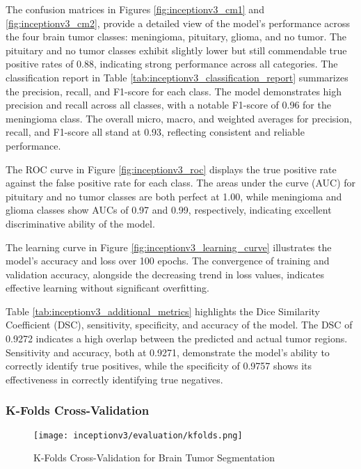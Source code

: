 The confusion matrices in Figures \ref{fig:inceptionv3_cm1} and \ref{fig:inceptionv3_cm2}, provide a detailed view of the model's performance across the four brain tumor classes: meningioma, pituitary, glioma, and no tumor. The pituitary and no tumor classes exhibit slightly lower but still commendable true positive rates of 0.88, indicating strong performance across all categories. The classification report in Table \ref{tab:inceptionv3_classification_report} summarizes the precision, recall, and F1-score for each class. The model demonstrates high precision and recall across all classes, with a notable F1-score of 0.96 for the meningioma class. The overall micro, macro, and weighted averages for precision, recall, and F1-score all stand at 0.93, reflecting consistent and reliable performance.

The ROC curve in Figure \ref{fig:inceptionv3_roc} displays the true positive rate against the false positive rate for each class. The areas under the curve (AUC) for pituitary and no tumor classes are both perfect at 1.00, while meningioma and glioma classes show AUCs of 0.97 and 0.99, respectively, indicating excellent discriminative ability of the model.

The learning curve in Figure \ref{fig:inceptionv3_learning_curve} illustrates the model's accuracy and loss over 100 epochs. The convergence of training and validation accuracy, alongside the decreasing trend in loss values, indicates effective learning without significant overfitting.

Table \ref{tab:inceptionv3_additional_metrics} highlights the Dice Similarity Coefficient (DSC), sensitivity, specificity, and accuracy of the model. The DSC of 0.9272 indicates a high overlap between the predicted and actual tumor regions. Sensitivity and accuracy, both at 0.9271, demonstrate the model's ability to correctly identify true positives, while the specificity of 0.9757 shows its effectiveness in correctly identifying true negatives.

\subsubsection{K-Folds Cross-Validation}

\begin{figure}[H]
  \begin{center}
    \texttt{[image: inceptionv3/evaluation/kfolds.png]}
  \end{center}
  \caption{K-Folds Cross-Validation for Brain Tumor Segmentation}\label{f:inceptionv3_kfolds}
\end{figure}

